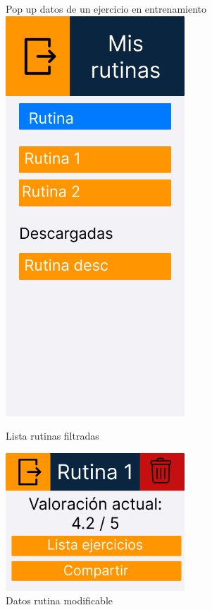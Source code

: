 \begin{figure}[H]
   \centering Pop up datos de un ejercicio en entrenamiento
    \includegraphics[width=0.6\textwidth]{fotos/Frame 47.png}
    \caption{Lista rutinas filtradas}
    \label{fig:Lista rutinas filtradas}
\end{figure}
\begin{figure}[H]
   \centering
    \includegraphics[width=0.6\textwidth]{fotos/Frame 48.png}
    \caption{Datos rutina modificable}
    \label{fig:Datos rutina modificable}
\end{figure}
